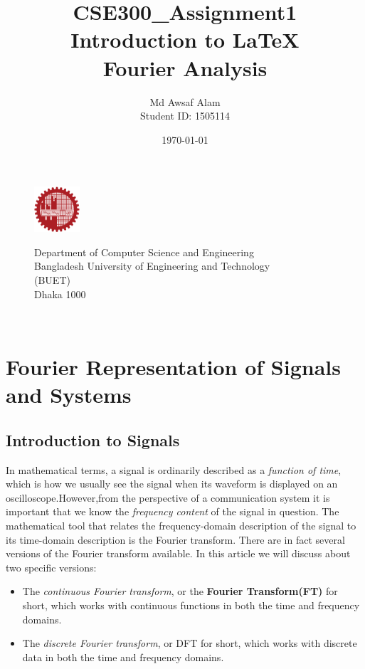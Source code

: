 \documentclass{article}
\title{CSE300\_Assignment1\\Introduction to \LaTeX \\Fourier Analysis}
\author{Md Awsaf Alam\\Student ID: 1505114}
\date{}
\newcommand{\FT}{Fourier Transform}
\begin{document}
\maketitle
\begin{figure}[h]
    \centering
    \includegraphics[width = 0.15\textwidth]{figures/logo.png}
    \centering

    Department of Computer Science and Engineering \\
Bangladesh University of Engineering and Technology\\
(BUET)\\
Dhaka 1000\\
\date{\today}\\
\end{figure}


\newpage

\tableofcontents
\newpage

\section{Fourier Representation of Signals and Systems}

\subsection{Introduction to Signals}
In mathematical terms, a signal is ordinarily described as a \textit{function of time}, which is how
we usually see the signal when its waveform is displayed on an oscilloscope.However,from the perspective of a communication system it is important
that we know the \textit{frequency content} of the signal in question. The mathematical tool that
relates the frequency-domain description of the signal to its time-domain description is the
Fourier transform. There are in fact several versions of the Fourier transform available. In this article we will discuss about two specific versions:
\begin{itemize}
    \item The \textit{continuous Fourier transform}, or the \textbf{\FT (FT)} for short, which
works with continuous functions in both the time and frequency domains.
    \item The \textit{discrete Fourier transform}, or DFT for short, which works with discrete data in
both the time and frequency domains.
\end{itemize}
\end{document}
